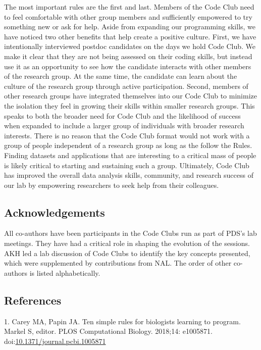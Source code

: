 \documentclass[
  11pt,
]{article}
\begin{document}
The most important rules are the first and last. Members of the Code
Club need to feel comfortable with other group members and sufficiently
empowered to try something new or ask for help. Aside from expanding our
programming skills, we have noticed two other benefits that help create
a positive culture. First, we have intentionally interviewed postdoc
candidates on the days we hold Code Club. We make it clear that they are
not being assessed on their coding skills, but instead use it as an
opportunity to see how the candidate interacts with other members of the
research group. At the same time, the candidate can learn about the
culture of the research group through active participation. Second,
members of other research groups have integrated themselves into our
Code Club to minimize the isolation they feel in growing their skills
within smaller research groups. This speaks to both the broader need for
Code Club and the likelihood of success when expanded to include a
larger group of individuals with broader research interests. There is no
reason that the Code Club format would not work with a group of people
independent of a research group as long as the follow the Rules. Finding
datasets and applications that are interesting to a critical mass of
people is likely critical to starting and sustaining such a group.
Ultimately, Code Club has improved the overall data analysis skills,
community, and research success of our lab by empowering researchers to
seek help from their colleagues.

\hypertarget{acknowledgements}{%
\subsection{Acknowledgements}\label{acknowledgements}}

All co-authors have been participants in the Code Clubs run as part of
PDS's lab meetings. They have had a critical role in shaping the
evolution of the sessions. AKH led a lab discussion of Code Clubs to
identify the key concepts presented, which were supplemented by
contributions from NAL. The order of other co-authors is listed
alphabetically.

\newpage

\hypertarget{references}{%
\subsection{References}\label{references}}

\hypertarget{refs}{}
\leavevmode\hypertarget{ref-Carey2018}{}%
1. Carey MA, Papin JA. Ten simple rules for biologists learning to
program. Markel S, editor. PLOS Computational Biology. 2018;14:
e1005871.
doi:\href{https://doi.org/10.1371/journal.pcbi.1005871}{10.1371/journal.pcbi.1005871}
\end{document}
